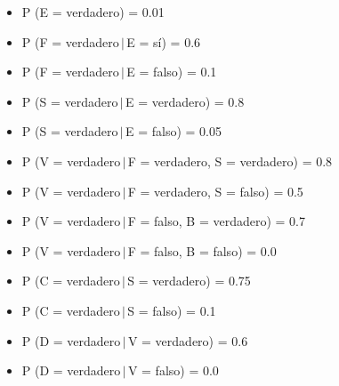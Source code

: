 \documentclass[letterpaper,11pt]{article}
\begin{document}
\begin{multicols}{2}
    \columnsep=3cm
    \begin{itemize}
\item P (E = verdadero) = 0.01
\item P (F = verdadero$\,|\,$E = sí) = 0.6
\item P (F = verdadero$\,|\,$E = falso) = 0.1
\item P (S = verdadero$\,|\,$E = verdadero) = 0.8
\item P (S = verdadero$\,|\,$E = falso) = 0.05
\item P (V = verdadero$\,|\,$F = verdadero, S = verdadero) = 0.8
\item P (V = verdadero$\,|\,$F = verdadero, S = falso) = 0.5
\item P (V = verdadero$\,|\,$F = falso, B = verdadero) = 0.7
\item P (V = verdadero$\,|\,$F = falso, B = falso) = 0.0
\item P (C = verdadero$\,|\,$S = verdadero) = 0.75
\item P (C = verdadero$\,|\,$S = falso) = 0.1
\item P (D = verdadero$\,|\,$V = verdadero) = 0.6
\item P (D = verdadero$\,|\,$V = falso) = 0.0
    \end{itemize}
\end{multicols}
\end{document}
